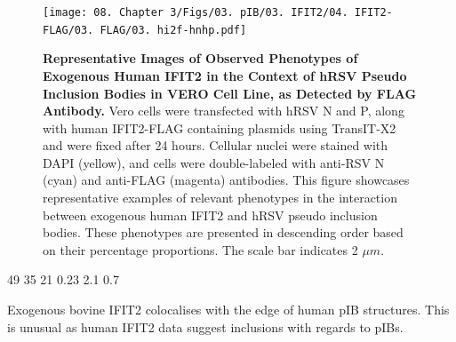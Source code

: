 \begin{figure}
    \centering
    \texttt{[image: 08. Chapter 3/Figs/03. pIB/03. IFIT2/04. IFIT2-FLAG/03. FLAG/03. hi2f-hnhp.pdf]}
    \caption[Representative Images of Observed Phenotypes of Exogenous Human IFIT2 in the Context of hRSV Pseudo Inclusion Bodies in VERO Cell Line, as Detected by FLAG Antibody.]{\textbf{Representative Images of Observed Phenotypes of Exogenous Human IFIT2 in the Context of hRSV Pseudo Inclusion Bodies in VERO Cell Line, as Detected by FLAG Antibody.} Vero cells were transfected with hRSV N and P, along with human IFIT2-FLAG containing plasmids using TransIT-X2 and were fixed after 24 hours. Cellular nuclei were stained with DAPI (yellow), and cells were double-labeled with anti-RSV N (cyan) and anti-FLAG (magenta) antibodies. This figure showcases representative examples of relevant phenotypes in the interaction between exogenous human IFIT2 and hRSV pseudo inclusion bodies. These phenotypes are presented in descending order based on their percentage proportions. The scale bar indicates 2 \(\mu m\).}
    \label{fig:Representative Images of Observed Phenotypes of Exogenous Human IFIT2 in the Context of hRSV Pseudo Inclusion Bodies in VERO Cell Line, as Detected by FLAG Antibody}
\end{figure}

49 35 21
0.23 2.1 0.7

Exogenous bovine IFIT2 colocalises with the edge of human pIB structures. This is unusual as human IFIT2 data suggest inclusions with regards to pIBs.  

